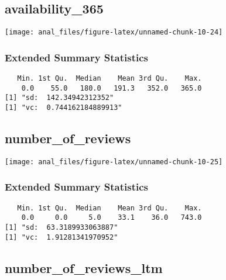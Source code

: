\pagebreak

\hypertarget{availability_365}{%
\subsection{availability\_365}\label{availability_365}}

\begin{center}\texttt{[image: anal\_files/figure-latex/unnamed-chunk-10-24]} \end{center}

\hypertarget{extended-summary-statistics-10}{%
\subsubsection{Extended Summary
Statistics}\label{extended-summary-statistics-10}}

\begin{verbatim}   Min. 1st Qu.  Median    Mean 3rd Qu.    Max. 
    0.0    55.0   180.0   191.3   352.0   365.0 
[1] "sd:  142.34942312352"
[1] "vc:  0.744162184889913"
\end{verbatim}

\pagebreak

\hypertarget{number_of_reviews}{%
\subsection{number\_of\_reviews}\label{number_of_reviews}}

\begin{center}\texttt{[image: anal\_files/figure-latex/unnamed-chunk-10-25]} \end{center}

\hypertarget{extended-summary-statistics-11}{%
\subsubsection{Extended Summary
Statistics}\label{extended-summary-statistics-11}}

\begin{verbatim}   Min. 1st Qu.  Median    Mean 3rd Qu.    Max. 
    0.0     0.0     5.0    33.1    36.0   743.0 
[1] "sd:  63.3189933063887"
[1] "vc:  1.91281341970952"
\end{verbatim}

\pagebreak

\hypertarget{number_of_reviews_ltm}{%
\subsection{number\_of\_reviews\_ltm}\label{number_of_reviews_ltm}}

